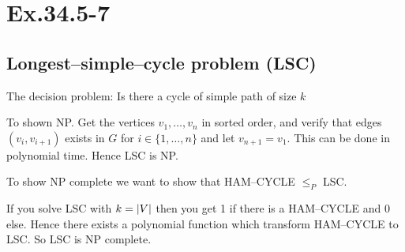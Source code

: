 \section*{Ex.34.5-7}
\subsection*{Longest--simple--cycle problem (LSC)}

The decision problem: Is there a cycle of simple path of size $k$

To shown NP. Get the vertices $v_1,\ldots, v_n$ in sorted order, and verify that edges $(v_i, v_{i+1})$ exists in $G$ for $i\in\{1,\ldots,n\}$ and let $v_{n+1} = v_1$. This can be done in polynomial time. Hence LSC is NP.

To show NP complete we want to show that HAM--CYCLE $\leq_P$ LSC.

If you solve LSC with  $k=\abs*{V}$ then you get 1 if there is a HAM--CYCLE and 0 else. Hence there exists a polynomial function which transform HAM--CYCLE to LSC. So LSC is NP complete.	